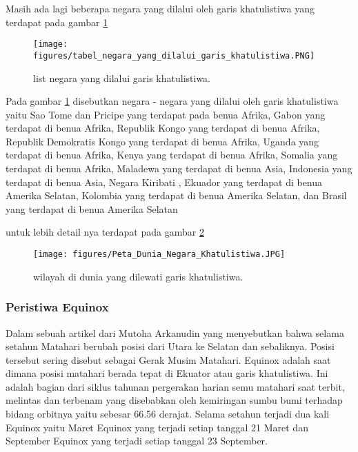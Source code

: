 	Masih ada lagi beberapa negara yang dilalui oleh garis khatulistiwa yang terdapat pada gambar \ref{tabel_negara_yang_dilalui_garis_khatulistiwa}

\begin{figure}[ht]
\centerline{\texttt{[image: figures/tabel\_negara\_yang\_dilalui\_garis\_khatulistiwa.PNG]}}
\caption{list negara yang dilalui garis khatulistiwa.}
\label{tabel_negara_yang_dilalui_garis_khatulistiwa}
\end{figure}

	Pada gambar \ref{tabel_negara_yang_dilalui_garis_khatulistiwa} disebutkan negara - negara yang dilalui oleh garis khatulistiwa yaitu Sao Tome dan Pricipe 
yang terdapat pada benua Afrika, Gabon yang terdapat di benua Afrika, Republik Kongo yang terdapat di benua Afrika, Republik Demokratis Kongo yang terdapat 
di benua Afrika, Uganda yang terdapat di benua Afrika, Kenya yang terdapat di benua Afrika, Somalia yang terdapat di benua Afrika, Maladewa yang terdapat 
di benua Asia, Indonesia yang terdapat di benua Asia, Negara Kiribati , Ekuador yang terdapat di benua Amerika Selatan, Kolombia 
yang terdapat di benua Amerika Selatan, dan Brasil yang terdapat di benua Amerika Selatan
	
	untuk lebih detail nya terdapat pada gambar \ref{Peta_Dunia_Negara_Khatulistiwa}
	
\begin{figure}[ht]
\centerline{\texttt{[image: figures/Peta\_Dunia\_Negara\_Khatulistiwa.JPG]}}
\caption{wilayah di dunia yang dilewati garis khatulistiwa.}
\label{Peta_Dunia_Negara_Khatulistiwa}
\end{figure}

\subsubsection {Peristiwa Equinox}

	Dalam sebuah artikel dari Mutoha Arkanudin yang menyebutkan bahwa selama setahun Matahari berubah posisi dari Utara ke Selatan dan sebaliknya. 
Posisi tersebut sering disebut sebagai Gerak Musim Matahari. Equinox adalah saat dimana posisi matahari berada tepat di Ekuator atau garis khatulistiwa. 
Ini adalah bagian dari siklus tahunan pergerakan harian semu matahari saat terbit, melintas dan terbenam yang disebabkan oleh kemiringan sumbu bumi
terhadap bidang orbitnya yaitu sebesar 66.56 derajat. Selama setahun terjadi dua kali Equinox yaitu Maret Equinox yang terjadi setiap tanggal 21 Maret dan September
Equinox yang terjadi setiap tanggal 23 September. 

